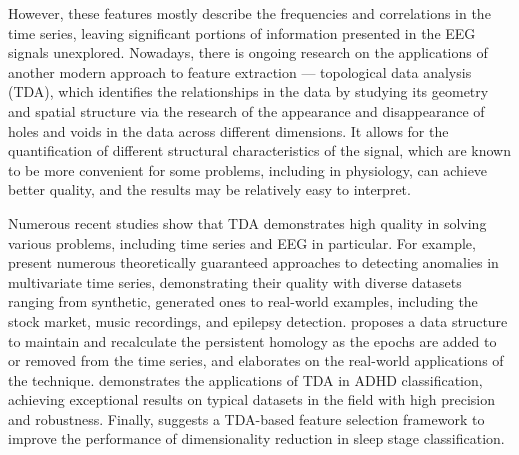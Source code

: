 \documentclass[10pt,lettersize,journal]{IEEEtran}
\begin{document}
However, these features mostly describe the frequencies and correlations in the time series, leaving significant portions of information presented in the EEG signals unexplored. Nowadays, there is ongoing research on the applications of another modern approach to feature extraction --- topological data analysis (TDA), which identifies the relationships in the data by studying its geometry and spatial structure via the research of the appearance and disappearance of holes and voids in the data across different dimensions. It allows for the quantification of different structural characteristics of the signal, which are known to be more convenient for some problems, including in physiology, can achieve better quality, and the results may be relatively easy to interpret.

Numerous recent studies show that TDA demonstrates high quality in solving various problems, including time series and EEG in particular. For example, \cite{chazal2024topologicalanalysisdetectinganomalies,rai2024identifyingextremeeventsstock,heo2024persistenthomologyfeaturedtime,chrétien2024timetopologicalanalysiseeg} present numerous theoretically guaranteed approaches to detecting anomalies in multivariate time series, demonstrating their quality with diverse datasets ranging from synthetic, generated ones to real-world examples, including the stock market, music recordings, and epilepsy detection. \cite{dimontesano2024dynamicallymaintainingpersistenthomology} proposes a data structure to maintain and recalculate the persistent homology as the epochs are added to or removed from the time series, and \cite{ost2024bananatreespersistencetime} elaborates on the real-world applications of the technique.  \cite{cai2024topologicalfeaturesearchmethod} demonstrates the applications of TDA in ADHD classification, achieving exceptional results on typical datasets in the field with high precision and robustness. Finally, \cite{deng2024twostagehierarchicalexplainablefeature} suggests a TDA-based feature selection framework to improve the performance of dimensionality reduction in sleep stage classification.
\end{document}
